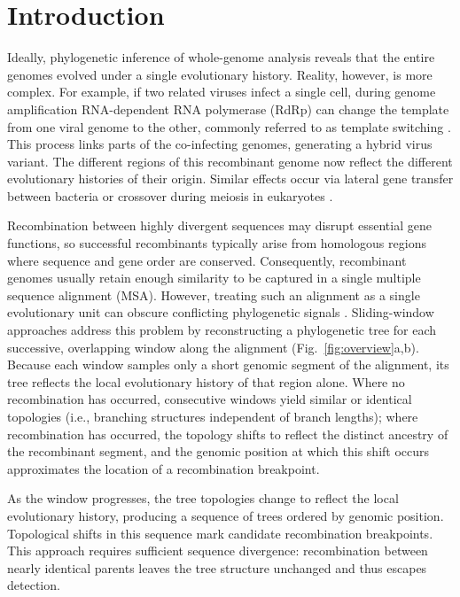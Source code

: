 
\section{Introduction}
Ideally, phylogenetic inference of whole-genome analysis reveals that the entire genomes evolved under a single evolutionary history. Reality, however, is more complex. For example, if two related viruses infect a single cell, during genome amplification RNA-dependent RNA polymerase (RdRp) can change the template from one viral genome to the other, commonly referred to as template switching \citep{simon2011rna}. This process links parts of the co-infecting genomes, generating a hybrid virus variant. The different regions of this recombinant genome now reflect the different evolutionary histories of their origin. Similar effects occur via lateral gene transfer between bacteria or crossover during meiosis in eukaryotes \citep{Ochman2000, Hunter2015}.

Recombination between highly divergent sequences may disrupt essential gene functions, so successful recombinants typically arise from homologous regions where sequence and gene order are conserved.
Consequently, recombinant genomes usually retain enough similarity to be captured in a single multiple sequence alignment (MSA). However, treating such an alignment as a single evolutionary unit can obscure conflicting phylogenetic signals \citep{Posada2002}. Sliding-window approaches address this problem by reconstructing a phylogenetic tree for each successive, overlapping window along the alignment \citep{Salminen1995, lole1999fulllength-6e0} (Fig.~\ref{fig:overview}a,b). Because each window samples only a short genomic segment of the alignment, its tree reflects the local evolutionary history of that region alone. Where no recombination has occurred, consecutive windows yield similar or identical topologies (i.e., branching structures independent of branch lengths); where recombination has occurred, the topology shifts to reflect the distinct ancestry of the recombinant segment, and the genomic position at which this shift occurs approximates the location of a recombination breakpoint.

As the window progresses, the tree topologies change to reflect the local evolutionary history, producing a sequence of trees ordered by genomic position. Topological shifts in this sequence mark candidate recombination breakpoints. This approach requires sufficient sequence divergence: recombination between nearly identical parents leaves the tree structure unchanged and thus escapes detection.


